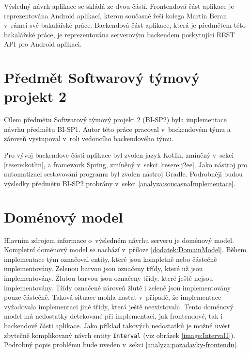     Výsledný návrh aplikace se skládá ze dvou částí. Frontendová část aplikace je reprezentována Android aplikací, kterou současně řeší kolega Martin Beran v~rámci své bakalářské práce. Backendová část aplikace, která je předmětem této bakalářské práce, je reprezentována serverovým backendem poskytující REST API pro Android aplikaci.


\section{Předmět Softwarový týmový projekt 2}\label{analyza:navrh:sp2}
    Cílem předmětu Softwarový týmový projekt 2 (BI-SP2) byla implementace návrhu předmětu BI-SP1. Autor této práce pracoval v~backendovém týmu a zároveň vystupoval v~roli vedoucího backendového týmu.
    
    Pro vývoj backendove části aplikace byl zvolen jazyk Kotlin, zmíněný v~sekci \ref{resere:kotlin}, a framework Spring, zmíněný v~sekci \ref{resere:j2ee}. Jako nástroj pro automatizaci sestavování programu byl zvolen nástroj Gradle. Podrobněji  budou výsledky předmětu BI-SP2 probrány v~sekci \ref{analyza:soucasnaImplementace}.
        
    
\section{Doménový model}\label{analyza:navrh:DomainModel}
    Hlavním zdrojem informace o~výsledném návrhu serveru je doménový model. Kompletní doménový model se nachází v~příloze \ref{dodatek:DomainModel}. Během implementace tým označoval entity, které jsou kompletně nebo částečně implementovány. Zelenou barvou jsou označeny třídy, které už jsou implementovány. Žlutou barvou jsou označeny třídy, které ještě nejsou implementovány. Třídy označené zároveň žlutě i zeleně jsou implementovány pouze částečně. Taková situace mohla nastat v~případě, že implementace vyžadovala implementaci jiné třídy, která ještě neexistovala. Tento doménový model má nedostatky detekované při implementaci, jak frontendové, tak i backendové části aplikace. Jako příklad takových nedostatků je možné uvést zbytečně komplikovaný návrh entity \texttt{Interval} (viz obrázek \ref{image:Interval1}). Podrobný popis problému bude uveden v~sekci \ref{analyza:pozadavky-frontendu}.

